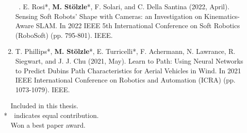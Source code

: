\begin{enumerate}
    \item[\faFileTextO \, \stepcounter{enumi}\arabic{enumi}.] E. Rosi*, \textbf{M. Stölzle}*, F. Solari, and C. Della Santina (2022, April). Sensing Soft Robots' Shape with Cameras: an Investigation on Kinematics-Aware SLAM. In 2022 IEEE 5th International Conference on Soft Robotics (RoboSoft) (pp. 795-801). IEEE.
    \item T. Phillips*, \textbf{M. Stölzle}*, E. Turricelli*, F. Achermann, N. Lawrance, R. Siegwart, and J. J. Chu (2021, May). Learn to Path: Using Neural Networks to Predict Dubins Path Characteristics for Aerial Vehicles in Wind. In 2021 IEEE International Conference on Robotics and Automation (ICRA) (pp. 1073-1079). IEEE.
\end{enumerate}

\vspace{0.5cm}
\noindent
\faFileTextO~~Included in this thesis.\\
*~~indicates equal contribution.\\
\faTrophy~~Won a best paper award.

